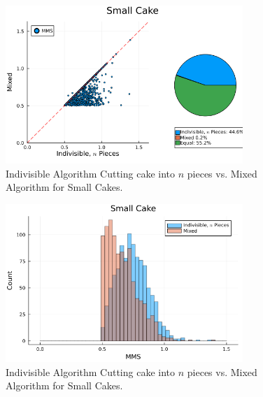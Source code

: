 \begin{figure}
    \centering
    \includegraphics[width=0.8\textwidth]{assets/plots/scatter_indivisible_n_pieces_vs_mixed_small_cake.png}
    \caption{Indivisible Algorithm Cutting cake into $n$ pieces vs. Mixed Algorithm for Small Cakes.}
    \label{fig:scatter_indivisible_n_pieces_vs_mixed_small_cake}
\end{figure}
\begin{figure}
    \centering
    \includegraphics[width=0.8\textwidth]{assets/plots/histogram_indivisible_n_pieces_vs_mixed_small_cake.png}
    \caption{Indivisible Algorithm Cutting cake into $n$ pieces vs. Mixed Algorithm for Small Cakes.}
    \label{fig:histogram_indivisible_n_pieces_vs_mixed_small_cake}
\end{figure}


